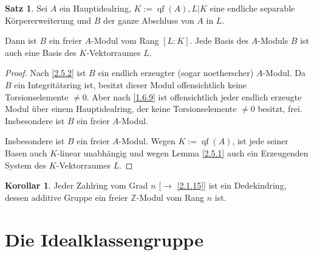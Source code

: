 \documentclass[
twoside=semi,
fontsize=12,
DIV=12, 
cleardoublepage=current,
leqno,
headings=optiontoheadandtoc, 
toc=idx
]{scrbook}
\newcommand{\Z}{\mathbb{Z}}
\DeclareMathOperator{\qf}{qf}
\theoremstyle{definition}
\newtheorem{satz}[definition]{Satz}
\newtheorem{korollar}[definition]{Korollar}
\begin{document}
 	\begin{satz}\label{2.5.5}\hfill\newline
 		Sei $A$ ein Hauptidealring, $K:=\qf(A), L|K$ eine endliche separable K\"orpererweiterung und $B$ der ganze Abschluss von $A$ in $L$. 
 		
 		\medskip\noindent
 		Dann ist $B$ ein freier $A$-Modul vom Rang $[L:K]$. Jede Basis des $A$-Moduls $B$ ist auch eine Basis des $K$-Vektorraumes $L$.
 		
 		\begin{proof}
 			Nach \ref{2.5.2} ist $B$ ein endlich erzeugter (sogar noetherscher) $A$-Modul. Da $B$ ein Integrit\"atsring ist, besitzt dieser Modul offensichtlich keine Torsionselemente $\neq 0$. Aber nach \ref{1.6.9} ist offensichtlich jeder endlich erzeugte Modul \"uber einem Hauptidealring, der keine Torsionselemente $\neq 0$ besitzt, frei. Insbesondere ist $B$ ein freier $A$-Modul.
 			
 			Insbesondere ist $B$ ein freier $A$-Modul. Wegen $K := \qf(A)$, ist jede seiner Basen auch $K$-linear unabh\"angig und wegen Lemma \ref{2.5.1} auch ein Erzeugenden System des $K$-Vektorraumes $L$.
 		\end{proof}
 	\end{satz}
 
 	\begin{korollar}\label{2.5.6}\hfill\newline
 		Jeder Zahlring vom Grad $n$ [$\to$ \ref{2.1.15}] ist ein Dedekindring, dessen additive Gruppe ein freier $\Z$-Modul vom Rang $n$ ist.
 	\end{korollar}
 
 	\newpage
 	
 	\section{Die Idealklassengruppe}\thispagestyle{sectionstart}
 	
\end{document}

